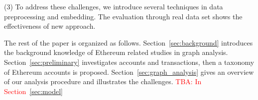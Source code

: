 (3) To address these challenges, we introduce several techniques in data preprocessing and embedding. The evaluation through real data set shows the effectiveness of new approach. 

The rest of the paper is organized as follows. Section~\ref{sec:background} introduces the background knowledge of Ethereum related studies in graph analysis. Section~\ref{sec:preliminary} investigates accounts and transactions, then a taxonomy of Ethereum accounts is proposed. Section~\ref{sec:graph_analysis} gives an overview of our analysis procedure and illustrates the challenges. \textcolor{red}{TBA: In Section~\ref{sec:model}}


